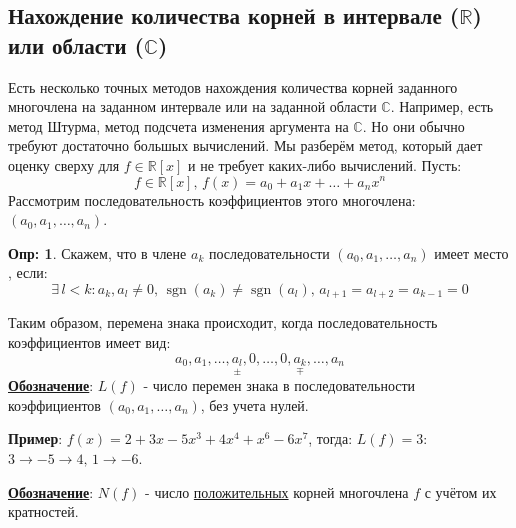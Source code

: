 \documentclass[12pt]{article}
\newcommand{\MR}{\mathbb{R}}
\newcommand{\MC}{\mathbb{C}}
\theoremstyle{definition}
\newtheorem{defn}{Опр:}
\DeclareMathOperator{\sgn}{sgn}
\begin{document}
\subsection*{Нахождение количества корней в интервале ($\MR$) или области ($\MC$)}
Есть несколько точных методов нахождения количества корней заданного многочлена на заданном интервале или на заданной области $\MC$. Например, есть метод Штурма, метод подсчета изменения аргумента на $\MC$. Но они обычно требуют достаточно большых вычислений. Мы разберём метод, который дает оценку сверху для $f\in \MR[x]$ и не требует каких-либо вычислений. Пусть: 
$$
	f \in \MR[x], \, f(x) = a_0 + a_1x + \dotsc + a_n x^n
$$ 
Рассмотрим последовательность коэффициентов этого многочлена: $(a_0, a_1,\dotsc, a_n)$. 
\begin{defn}
	Скажем, что в члене $a_k$ последовательности $(a_0, a_1,\dotsc, a_n)$ имеет место , если:
	$$
		\exists \, l < k \colon a_k, a_l \neq 0, \, \sgn(a_k) \neq \sgn(a_l), \, a_{l+1} = a_{l+2} = a_{k-1} = 0
	$$ 
\end{defn}
Таким образом, перемена знака происходит, когда последовательность коэффициентов имеет вид:
$$
	a_0, a_1,\dotsc, \underset{\pm}{a_l}, 0, \dotsc, 0, \underset{\mp}{a_k}, \dotsc,  a_n
$$
\textbf{\uline{Обозначение}}: $L(f)$ - число перемен знака в последовательности коэффициентов $(a_0, a_1,\dotsc, a_n)$, без учета нулей.

\textbf{Пример}: $f(x) = 2 + 3x - 5x^3 + 4x^4 + x^6 - 6x^7$, тогда: $L(f) = 3$: $3 \rightarrow -5 \rightarrow 4, \, 1 \rightarrow -6$.

\textbf{\uline{Обозначение}}: $N(f)$ - число \uline{положительных} корней многочлена $f$ с учётом их кратностей.
\end{document}
